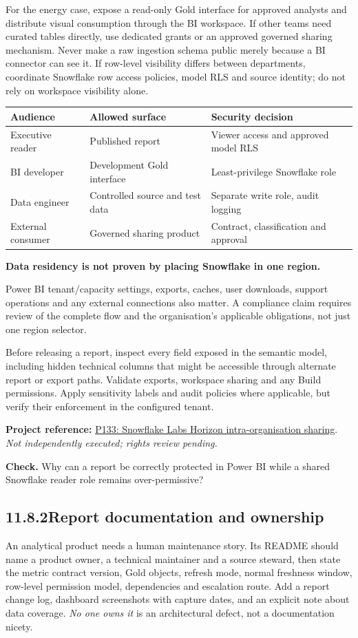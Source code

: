 \documentclass[11pt,twoside]{article}
\newcommand{\topic}[2]{\subsection*{#1\quad #2}}
\newcommand{\repo}[2]{\par\begingroup\fontsize{8.0}{9.6}\selectfont\sffamily\color{inkgray}\textbf{Project reference:} \href{#2}{#1}. \textit{Not independently executed; rights review pending.}\par\endgroup}
\begin{document}
For the energy case, expose a read-only Gold interface for approved analysts and distribute visual consumption through the BI workspace. If other teams need curated tables directly, use dedicated grants or an approved governed sharing mechanism. Never make a raw ingestion schema public merely because a BI connector can see it. If row-level visibility differs between departments, coordinate Snowflake row access policies, model RLS and source identity; do not rely on workspace visibility alone.
\begin{center}\renewcommand{\arraystretch}{1.12}\begin{tabularx}{\linewidth}{@{}p{33mm}XX@{}}\toprule
\textbf{Audience}&\textbf{Allowed surface}&\textbf{Security decision}\\\midrule
Executive reader&Published report&Viewer access and approved model RLS\\
BI developer&Development Gold interface&Least-privilege Snowflake role\\
Data engineer&Controlled source and test data&Separate write role, audit logging\\
External consumer&Governed sharing product&Contract, classification and approval\\\bottomrule\end{tabularx}\end{center}
\begin{insight}\textbf{Data residency is not proven by placing Snowflake in one region.}\par
Power BI tenant/capacity settings, exports, caches, user downloads, support operations and any external connections also matter. A compliance claim requires review of the complete flow and the organisation's applicable obligations, not just one region selector.\end{insight}
Before releasing a report, inspect every field exposed in the semantic model, including hidden technical columns that might be accessible through alternate report or export paths. Validate exports, workspace sharing and any Build permissions. Apply sensitivity labels and audit policies where applicable, but verify their enforcement in the configured tenant.
\repo{P133: Snowflake Labs Horizon intra-organisation sharing}{https://github.com/Snowflake-Labs/sfguide-horizon-intra-organization-sharing}
\textbf{Check.} Why can a report be correctly protected in Power BI while a shared Snowflake reader role remains over-permissive?
\newpage
\topic{11.8.2}{Report documentation and ownership}
An analytical product needs a human maintenance story. Its README should name a product owner, a technical maintainer and a source steward, then state the metric contract version, Gold objects, refresh mode, normal freshness window, row-level permission model, dependencies and escalation route. Add a report change log, dashboard screenshots with capture dates, and an explicit note about data coverage. \emph{No one owns it} is an architectural defect, not a documentation nicety.
\end{document}
